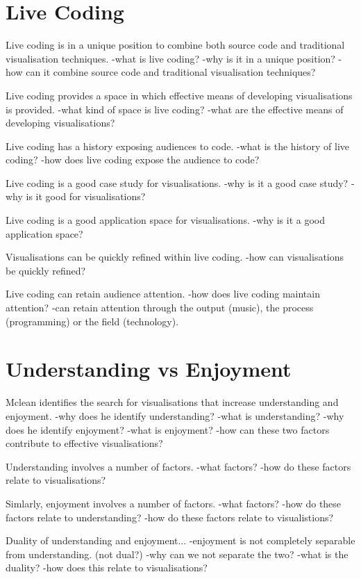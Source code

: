 \section{Live Coding}

Live coding is in a unique position to combine both source code and traditional visualisation techniques.
-what is live coding?
-why is it in a unique position?
-how can it combine source code and traditional visualisation techniques?

Live coding provides a space in which effective means of developing visualisations is provided.
-what kind of space is live coding?
-what are the effective means of developing visualisations?

Live coding has a history exposing audiences to code.
-what is the history of live coding?
-how does live coding expose the audience to code?

Live coding is a good case study for visualisations.
-why is it a good case study?
-why is it good for visualisations?

Live coding is a good application space for visualisations.
-why is it a good application space?

Visualisations can be quickly refined within live coding.
-how can visualisations be quickly refined?

Live coding can retain audience attention.
-how does live coding maintain attention?
-can retain attention through the output (music), the process (programming) or the field (technology).


\section{Understanding vs Enjoyment}

Mclean identifies the search for visualisations that increase understanding and enjoyment.
-why does he identify understanding?
-what is understanding?
-why does he identify enjoyment?
-what is enjoyment?
-how can these two factors contribute to effective visualisations?

Understanding involves a number of factors.
-what factors?
-how do these factors relate to visualisations?

Simlarly, enjoyment involves a number of factors.
-what factors?
-how do these factors relate to understanding?
-how do these factors relate to visualistions?

Duality of understanding and enjoyment...
-enjoyment is not completely separable from understanding. (not dual?)
-why can we not separate the two?
-what is the duality?
-how does this relate to visualisations?


